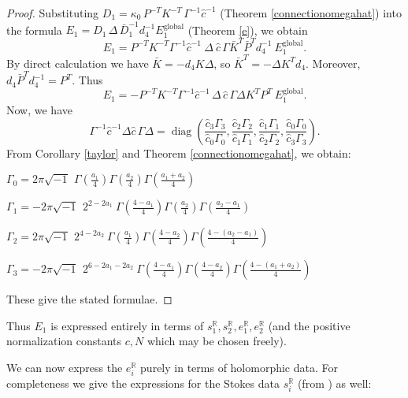 \documentclass[a4paper,12pt,leqno]{amsart}
\numberwithin{equation}{section}
\theoremstyle{plain}
\theoremstyle{definition}
\newcommand{\R}{\mathbb R}
\newcommand{\De}{\Delta}
\newcommand{\Ga}{\Gamma}
\newcommand{\ka}{\kappa}
\DeclareMathOperator{\diag}{diag}
\newcommand{\no}{\noindent}
\newcommand{\ii}{ {\scriptstyle\sqrt{-1}}\, }
\newcommand{\Asharp}{\Ga}
\begin{document}
\begin{proof} 
Substituting 
$D_1= \ka_0\,  P^{-T} K^{-T}\, {\Asharp}^{-1} \hat c^{-1}$ 
(Theorem \ref{connectionomegahat})
into  the formula
$E_1=D_1\, \De\, \bar D_1^{-1} d_4^{-1}
E_1^{\text{global}}$
(Theorem \ref{e}), we obtain
\[
E_1 = 
P^{-T} K^{-T} {\Asharp}^{-1} \hat c^{-1}
\ 
\De
\ 
\hat c \, \Asharp  \bar K^T \bar P^T d_4^{-1} 
\ 
E_1^{\text{global}}.
\]
By direct calculation we have $\bar K = -  d_4 K \De$,  so
$\bar K^T = -\De K^T d_4$.  Moreover, $d_4 \bar P^T d_4^{-1}=P^T$.  Thus 
\[
E_1 = 
-P^{-T} K^{-T} {\Asharp}^{-1} \hat c^{-1}
\,
\De
\,
\hat c \, \Asharp \De  K^T P^T
\ 
E_1^{\text{global}}.
\]
Now, we have 
\[
{\Asharp}^{-1} \hat c^{-1} \De \hat c \, \Asharp \De
=
\diag
\left(
\frac{\hat c_3 \Asharp_3}{\hat c_0 \Asharp_0},
\frac{\hat c_2 \Asharp_2}{\hat c_1 \Asharp_1},
\frac{\hat c_1 \Asharp_1}{\hat c_2 \Asharp_2},
\frac{\hat c_0 \Asharp_0}{\hat c_3 \Asharp_3}
\right).
\]
From  Corollary \ref{taylor} and Theorem \ref{connectionomegahat}, we obtain:

$\Asharp_0= 2\pi\ii \ 
\Ga(\tfrac{a_1}{4})\Ga(\tfrac{a_2}{4})\Ga(\tfrac{a_1+a_2}{4})$

$\Asharp_1= -2\pi\ii \ 2^{2-2a_1} \ 
\Ga(\tfrac{4-a_1}{4})\Ga(\tfrac{a_2}{4})\Ga(\tfrac{a_2-a_1}{4})$

$\Asharp_2= 2\pi\ii \ 2^{4-2a_2} \ 
\Ga(\tfrac{a_1}{4})\Ga(\tfrac{4-a_2}{4})\Ga(\tfrac{4-(a_2-a_1)}{4})$

$\Asharp_3= -2\pi\ii \ 2^{6-2a_1-2a_2} \ 
\Ga(\tfrac{4-a_1}{4})\Ga(\tfrac{4-a_2}{4})\Ga(\tfrac{4-(a_1+a_2)}{4})$

\no These give the stated formulae.
\end{proof}

Thus $E_1$ is expressed entirely in terms of $s^\R_1,s^\R_2,e^\R_1,e^\R_2$ (and the positive normalization constants $c,N$ which may be chosen freely).  

We can now express the $e_i^\R$ purely in terms of holomorphic data. For completeness we give the expressions for the Stokes data $s_i^\R$ (from \cite{GuItLi15}) as well:
\end{document}
